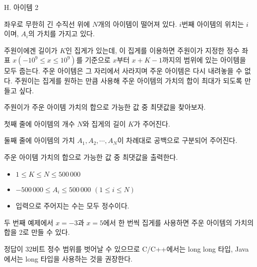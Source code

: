 \def\probtitle{아이템 2}
\def\probno{H} %

\begin{problem}{\probno{}. \probtitle{}}

좌우로 무한히 긴 수직선 위에 $N$개의 아이템이 떨어져 있다. $i$번째 아이템의 위치는 $i$이며, $A_i$의 가치를 가지고 있다.

주원이에겐 길이가 $K$인 집게가 있는데, 이 집게를 이용하면 주원이가 지정한 정수 좌표 $x(-10^9 \le x \le 10^9)$를 기준으로 $x$부터 $x+K-1$까지의 범위에 있는 아이템을 모두 줍는다. 주운 아이템은 그 자리에서 사라지며 주운 아이템은 다시 내려놓을 수 없다. 주원이는 집게를 원하는 만큼 사용해 주운 아이템의 가치의 합이 최대가 되도록 만들고 싶다.

주원이가 주운 아이템 가치의 합으로 가능한 값 중 최댓값을 찾아보자.

\InputFile

첫째 줄에 아이템의 개수 $N$와 집게의 길이 $K$가 주어진다.

둘째 줄에 아이템의 가치 $A_1, A_2, \cdots, A_N$이 차례대로 공백으로 구분되어 주어진다.

\OutputFile

주운 아이템 가치의 합으로 가능한 값 중 최댓값을 출력한다.

\Constraints

\begin{itemize}[topsep=0pt,noitemsep]
    \item $1 \leq K \leq N \leq 500\,000$
    \item $-500\,000 \leq A_i \leq 500\,000$ $(1 \leq i \leq N)$
    \item 입력으로 주어지는 수는 모두 정수이다.
\end{itemize}

\Example

\begin{example}
\end{example}

두 번째 예제에서 $x=-3$과 $x=5$에서 한 번씩 집게를 사용하면 주운 아이템의 가치의 합을 2로 만들 수 있다.


\Notes
정답이 32비트 정수 범위를 벗어날 수 있으므로 C/C++에서는 long long 타입, Java에서는 long 타입을 사용하는 것을 권장한다.

\end{problem}